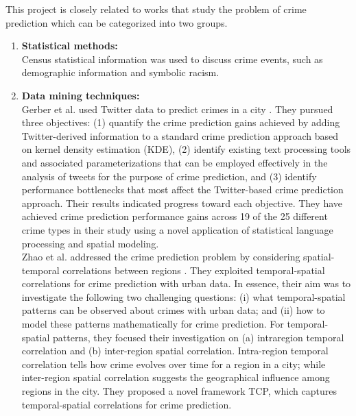 This project is closely related to works that study the problem of 
crime prediction \cite{a3, p3} which can be categorized into two groups. 
\begin{enumerate}
    \item \textbf{Statistical methods:}\\[0.2cm]
    Census statistical information was used to discuss crime events, such 
    as demographic information and symbolic racism.\newpage
    
    \item \textbf{Data mining techniques:}\\[0.2cm]
    Gerber et al. used Twitter data to predict crimes in a city \cite{a3}. They pursued 
    three objectives: (1) quantify the crime prediction gains achieved by adding 
    Twitter-derived information to a standard crime prediction approach based on
     kernel density estimation (KDE), (2) identify existing text processing tools
      and associated parameterizations that can be employed effectively in the 
      analysis of tweets for the purpose of crime prediction, and (3) identify
       performance bottlenecks that most affect the Twitter-based crime prediction
        approach. Their results indicated progress toward each objective. They
         have achieved crime prediction performance gains across 19 of the 25 
         different crime types in their study using a novel application of 
         statistical language processing and spatial modeling.\\
    Zhao et al. addressed the crime prediction problem by considering spatial-temporal
     correlations between regions \cite{p3}. They exploited temporal-spatial
      correlations 
     for crime
    prediction with urban data. In essence, their aim was to investigate the following 
    two challenging questions: (i) what temporal-spatial patterns can be observed 
    about crimes with urban data; and (ii) how to model these patterns 
    mathematically for crime prediction. For temporal-spatial patterns, 
    they focused their investigation on (a) intraregion temporal correlation 
    and (b) inter-region spatial correlation. Intra-region temporal correlation 
    tells how crime evolves over time for a region in a city; while inter-region
     spatial correlation suggests the geographical influence among regions in the
      city. They proposed a novel framework TCP, which captures temporal-spatial 
      correlations for crime prediction.
\end{enumerate}

